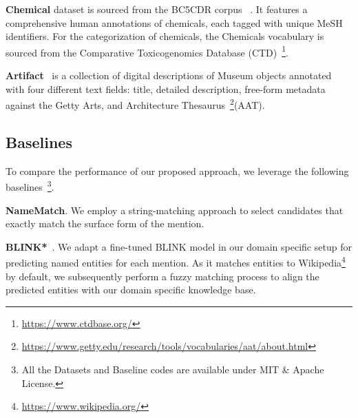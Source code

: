 \documentclass[11pt]{article}
\newcommand{\td}[1]{\textcolor{blue}{[{SP: #1}]}}
\begin{document}
\noindent
\textbf{Chemical} dataset %
is sourced from the BC5CDR corpus ~\cite{li2016biocreative}. It features a comprehensive human annotations of chemicals, each tagged with unique MeSH identifiers. 
For the categorization of chemicals, the Chemicals vocabulary is sourced from the Comparative Toxicogenomics Database (CTD)~\footnote{\url{https://www.ctdbase.org/}}. 

\noindent
\textbf{Artifact}~\cite{CadavidSnchez2023EvaluatingEE} is a collection of digital descriptions of Museum objects 
annotated with four different text fields:
title, detailed description, free-form metadata against the Getty
Arts, and Architecture Thesaurus~\footnote{\url{https://www.getty.edu/research/tools/vocabularies/aat/about.html}}(AAT). 





\subsection{Baselines}
To compare the performance of our proposed approach, we leverage the following baselines~\footnote{All the Datasets and Baseline codes are available under MIT \& Apache License.}.

\noindent
\textbf{NameMatch}\cite{klie2020zero}. We employ a string-matching approach to select candidates that exactly match the surface form of the mention.

\noindent
\textbf{BLINK*}~\cite{wu2019zero}. We adapt a fine-tuned BLINK model in our domain specific setup for predicting named entities for each mention. As it matches entities to Wikipedia\footnote{\url{https://www.wikipedia.org/}} by default, we subsequently perform a fuzzy matching process to align the predicted entities with our domain specific knowledge base.
\end{document}
